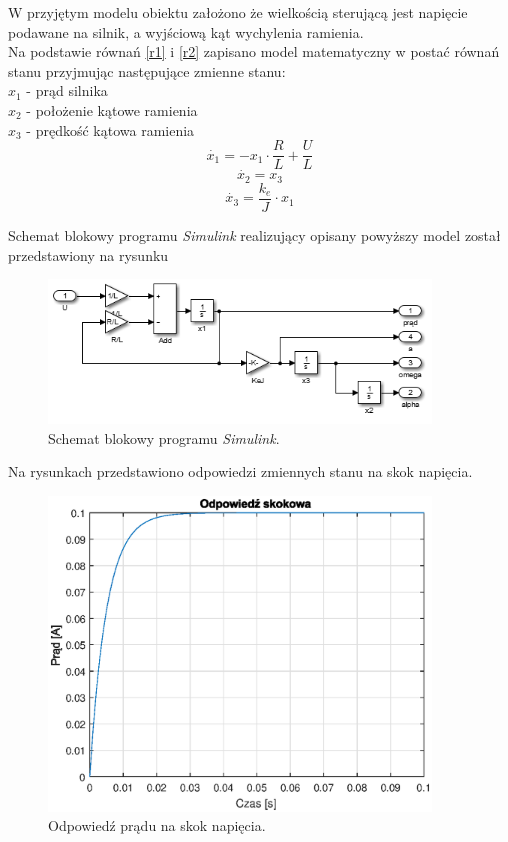W przyjętym modelu obiektu założono że wielkością sterującą jest napięcie podawane na silnik, a wyjściową kąt wychylenia ramienia.\\
Na podstawie równań \ref{r1} i \ref{r2} zapisano model matematyczny w postać równań stanu przyjmując następujące zmienne stanu:\\
$x_1$ - prąd silnika\\
$x_2$ -  położenie kątowe ramienia\\
$x_3$ - prędkość kątowa ramienia\\
\begin{equation}\label{key}
\dot {x_1} = -x_1  \cdot \frac{R}{L} + \frac{U}{L}
\end{equation}
\begin{equation}\label{key}
\dot {x_2} = x_3
\end{equation}
\begin{equation}\label{key}
\dot {x_3} = \frac{k_e}{J} \cdot x_1
\end{equation}

Schemat blokowy programu \textit{Simulink} realizujący opisany powyższy model został przedstawiony na rysunku 

\begin{figure}[h]
	\centering
	\includegraphics[width=4in]{Figures/model.png}
	\caption{Schemat blokowy programu \textit{Simulink}.}
	\label{fig:model}
\end{figure}

Na rysunkach  przedstawiono odpowiedzi zmiennych stanu na skok napięcia.

\begin{figure}[h]
	\centering
	\includegraphics[width=4in]{Figures/step_curr.eps}
	\caption{Odpowiedź prądu na skok napięcia.}
	\label{fig:step}
\end{figure}

